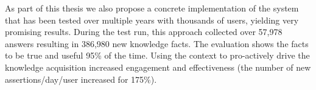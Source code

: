 As part of this thesis we also propose a concrete implementation of the 
system that has been tested over multiple years with thousands of users, yielding very promising results. During the test run, this approach collected
over 57,978 answers resulting in 386,980 new knowledge facts. The evaluation shows the facts to be true and useful 95\% of the time. Using the context to pro-actively drive the knowledge acquisition increased engagement and effectiveness (the number of new assertions/day/user increased for 175\%).

